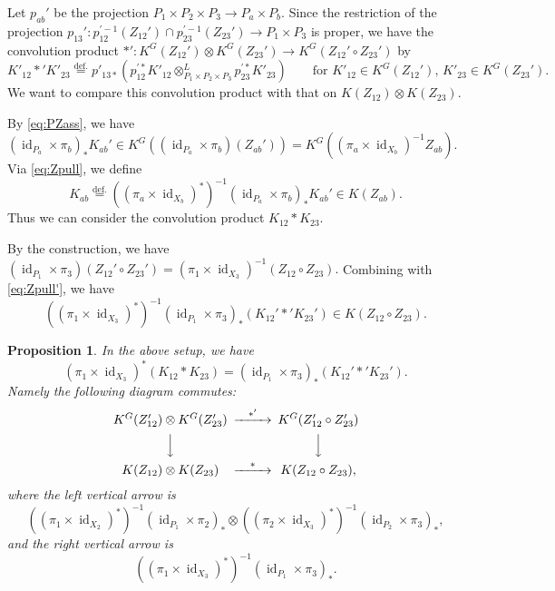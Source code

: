 \documentclass[12pt]{amsart}
\newtheorem{Proposition}[equation]{Proposition}
\theoremstyle{definition}
\theoremstyle{remark}
\numberwithin{equation}{subsection}
\newcommand{\defeq}{\overset{\operatorname{\scriptstyle def.}}{=}}
\newcommand{\id}{\operatorname{id}}
\begin{document}
Let $p_{ab}'$ be the projection $P_1\times P_2\times P_3\to P_a\times
P_b$.
Since the restriction of the projection 
$p_{13}'\colon p_{12}^{\prime-1}(Z_{12}')\cap
p_{23}^{\prime-1}(Z_{23}')\to P_1\times P_3$ is proper,
we have the convolution product
$*'\colon K^G(Z_{12}')\otimes K^G(Z_{23}') \to K^G(Z_{12}'\circ
Z_{23}')$ by
\begin{equation*}
  K'_{12}*' K'_{23}
  \defeq p'_{13*} \left(
  p_{12}^{\prime *} K'_{12}\otimes^L_{P_1\times P_2\times P_3}
  p_{23}^{\prime *} K'_{23}\right)
  \qquad\text{for $K'_{12}\in K^G(Z_{12}')$, $K'_{23}\in K^G(Z_{23}')$}.
\end{equation*}
We want to compare this convolution product with that on
$K(Z_{12})\otimes K(Z_{23})$.

By \eqref{eq:PZass}, we have $(\id_{P_a}\times\pi_b)_* K_{ab}'
\in K^G((\id_{P_a}\times\pi_b)(Z_{ab}'))
 = K^G((\pi_a\times\id_{X_b})^{-1}Z_{ab})$.
Via \eqref{eq:Zpull}, we define
\begin{equation}\label{eq:KabDef}
   K_{ab} \defeq \left((\pi_a\times\id_{X_b})^*\right)^{-1}
     (\id_{P_a}\times\pi_b)_* K_{ab}' \in K(Z_{ab}).
\end{equation}
Thus we can consider the convolution product $K_{12} * K_{23}$.

By the construction, we have 
\(
(\id_{P_1}\times\pi_3)(Z_{12}'\circ Z_{23}') = 
(\pi_1\times\id_{X_3})^{-1}(Z_{12}\circ Z_{23}).
\)
Combining with \eqref{eq:Zpull'}, we have
\begin{equation*}
   \left((\pi_1\times\id_{X_3})^*\right)^{-1}(\id_{P_1}\times\pi_3)_*
   (K_{12}' *' K_{23}') \in
   K(Z_{12}\circ Z_{23}).
\end{equation*}

\begin{Proposition}\label{prop:Pconv}
In the above setup, we have
\begin{equation}\label{eq:Pconv}
  (\pi_1\times\id_{X_3})^* (K_{12} * K_{23})
  = (\id_{P_1}\times\pi_3)_* ( K_{12}' *' K_{23}' ).
\end{equation}
Namely the following diagram commutes:
\begin{equation*}
\begin{CD}
  K^G(Z'_{12})\otimes K^G(Z'_{23}) @>{*'}>> K^G(Z'_{12}\circ Z'_{23}) \\
  @VVV
  @VVV \\
  K(Z_{12})\otimes K(Z_{23}) @>{*}>> K(Z_{12}\circ Z_{23}),
\end{CD}
\end{equation*}
where the left vertical arrow is
\begin{equation*}
\left((\pi_1\times\id_{X_2})^*\right)^{-1}
     (\id_{P_1}\times\pi_2)_* \otimes
 \left((\pi_2\times\id_{X_3})^*\right)^{-1}
     (\id_{P_2}\times\pi_3)_* ,
\end{equation*}
and the right vertical arrow is
\begin{equation*}
 \left((\pi_1\times\id_{X_3})^*\right)^{-1}
     (\id_{P_1}\times\pi_3)_*    .
\end{equation*}
\end{Proposition}
\end{document}
